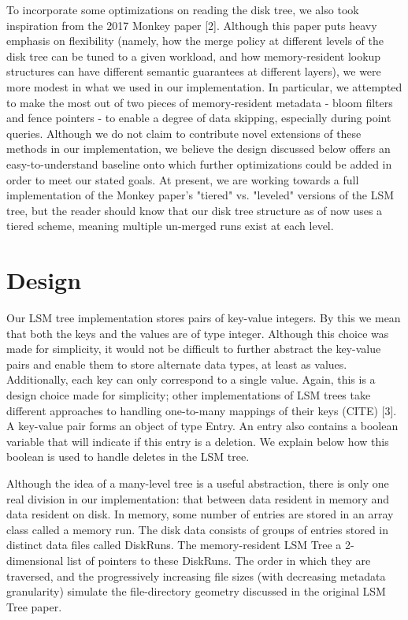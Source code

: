 \documentclass[12pt]{article}
\begin{document}
	To incorporate some optimizations on reading the disk tree, we also took inspiration from the 2017 Monkey paper [2]. Although this paper puts heavy emphasis on flexibility (namely, how the merge policy at different levels of the disk tree can be tuned to a given workload, and how memory-resident lookup structures can have different semantic guarantees at different layers), we were more modest in what we used in our implementation. In particular, we attempted to make the most out of two pieces of memory-resident metadata - bloom filters and fence pointers - to enable a degree of data skipping, especially during point queries. Although we do not claim to contribute novel extensions of these methods in our implementation, we believe the design discussed below offers an easy-to-understand baseline onto which further optimizations could be added in order to meet our stated goals. At present, we are working towards a full implementation of the Monkey paper's "tiered" vs. "leveled" versions of the LSM tree, but the reader should know that our disk tree structure as of now uses a tiered scheme, meaning multiple un-merged runs exist at each level.

\section{Design}
\indent \indent Our LSM tree implementation stores pairs of key-value integers. By this we mean that both the keys and the values are of type integer. Although this choice was made for simplicity, it would not be difficult to further abstract the key-value pairs and enable them to store alternate data types, at least as values. Additionally, each key can only correspond to a single value. Again, this is a design choice made for simplicity; other implementations of LSM trees take different approaches to handling one-to-many mappings of their keys (CITE) [3]. A key-value pair forms an object of type Entry. An entry also contains a boolean variable that will indicate if this entry is a deletion. We explain below how this boolean is used to handle deletes in the LSM tree.
	
	Although the idea of a many-level tree is a useful abstraction, there is only one real division in our implementation: that between data resident in memory and data resident on disk. In memory, some number of entries are stored in an array class called a memory run. The disk data consists of groups of entries stored in distinct data files called DiskRuns. The memory-resident LSM Tree a 2-dimensional list of pointers to these DiskRuns. The order in which they are traversed, and the progressively increasing file sizes (with decreasing metadata granularity) simulate the file-directory geometry discussed in the original LSM Tree paper.
	
\end{document}
